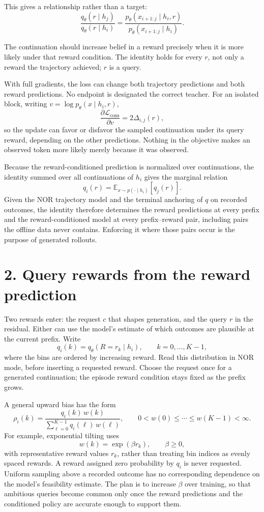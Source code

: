 \documentclass{article}
\begin{document}
This gives a relationship rather than a target:
\[
\frac{q_\theta(r \mid h_j)}{q_\theta(r \mid h_i)} = \frac{p_\theta(x_{i+1:j} \mid h_i, r)}{p_\theta(x_{i+1:j} \mid h_i)}.
\]

The continuation should increase belief in a reward precisely when it is more likely under that reward
condition. The identity holds for every $r$, not only a reward the trajectory achieved; $r$ is a query.

With full gradients, the loss can change both trajectory predictions and both reward predictions. No
endpoint is designated the correct teacher. For an isolated block, writing $v=\log p_\theta(x\mid h_i,r)$,
\[
\frac{\partial\mathcal L_{\mathrm{cons}}}{\partial v}=2\Delta_{i,j}(r),
\]
so the update can favor or disfavor the sampled continuation under its query reward, depending on the
other predictions. Nothing in the objective makes an observed token more likely merely because it was
observed.

Because the reward-conditioned prediction is normalized over continuations, the identity summed over all
continuations of $h_i$ gives the marginal relation
\[
q_i(r) = \mathbb{E}_{x \sim p(\cdot \mid h_i)}[q_j(r)].
\]
Given the NOR trajectory model and the terminal anchoring of $q$ on recorded outcomes, the identity therefore
determines the reward predictions at every prefix and the reward-conditioned model at every
prefix--reward pair, including pairs the offline data never contains. Enforcing it where those pairs occur
is the purpose of generated rollouts.

\section*{2. Query rewards from the reward prediction}

Two rewards enter: the request $c$ that shapes generation, and the query $r$ in the residual. Either can
use the model's estimate of which outcomes are plausible at the current prefix. Write
\[
q_i(k) = q_\theta(R=r_k \mid h_i), \qquad k=0,\ldots,K-1,
\]
where the bins are ordered by increasing reward. Read this distribution in NOR mode, before inserting a
requested reward. Choose the request once for a generated continuation; the episode reward condition stays
fixed as the prefix grows.

A general upward bias has the form
\[
\rho_i(k)
= \frac{q_i(k)\,w(k)}{\sum_{\ell=0}^{K-1}q_i(\ell)\,w(\ell)},
\qquad 0<w(0)\leq \cdots \leq w(K-1)<\infty.
\]
For example, exponential tilting uses
\[
w(k)=\exp(\beta r_k), \qquad \beta\geq 0,
\]
with representative reward values $r_k$, rather than treating bin indices as evenly spaced rewards.
A reward assigned zero probability by $q_i$ is never requested. Uniform sampling above a recorded outcome
has no corresponding dependence on the model's feasibility estimate. The plan is to increase $\beta$ over
training, so that ambitious queries become common only once the reward predictions and the conditioned
policy are accurate enough to support them.
\end{document}
